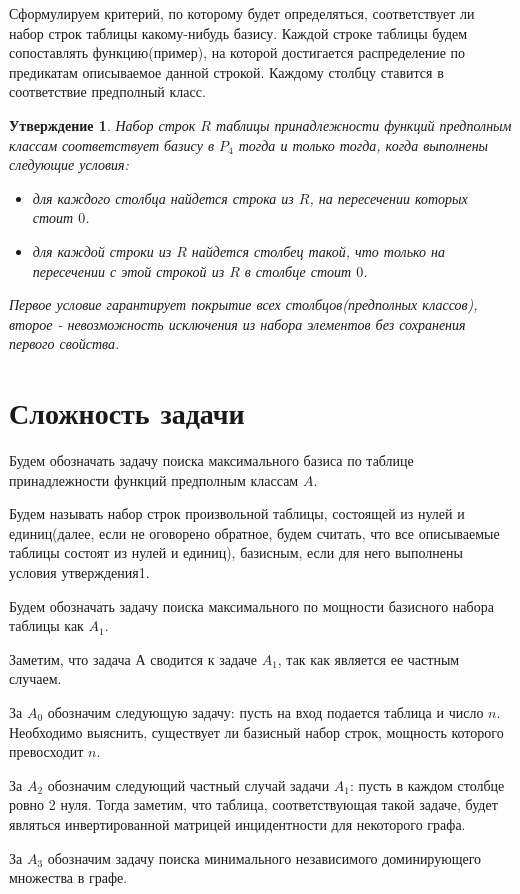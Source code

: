 \documentclass[a4paper,14pt]{extreport}
\newtheorem{utv}{Утверждение}
\begin{document}
Сформулируем критерий, по которому будет определяться, соответствует ли набор строк таблицы какому-нибудь базису.
Каждой строке таблицы будем сопоставлять функцию(пример), на которой достигается распределение по предикатам описываемое данной строкой. Каждому столбцу ставится в соответствие предполный класс.  
\begin{utv}
Набор строк $R$ таблицы принадлежности функций предполным классам соответствует базису в $P_4$ тогда и только тогда, когда выполнены следующие условия:
\begin{itemize}
\item для каждого столбца найдется строка из $R$, на пересечении которых стоит $0$.    
\item для каждой строки из $R$ найдется столбец такой, что только на пересечении с этой строкой из $R$ в столбце стоит $0$.   
\end{itemize}
Первое условие гарантирует покрытие всех столбцов(предполных классов), второе - невозможность исключения из набора элементов без сохранения первого свойства. 
\end{utv}

\section{Сложность задачи}
Будем обозначать задачу поиска максимального базиса по таблице принадлежности функций предполным классам $A$.

Будем называть набор строк произвольной таблицы, состоящей из нулей и единиц(далее, если не оговорено обратное, будем считать, что все описываемые таблицы состоят из нулей и единиц), базисным, если для него выполнены условия утверждения1.

Будем обозначать задачу поиска максимального по мощности базисного набора таблицы как $A_1$.

Заметим, что задача А сводится к задаче $A_1$, так как является ее частным случаем.

За $A_0$ обозначим следующую задачу: пусть на вход подается таблица и число $n$. Необходимо выяснить, существует ли базисный набор строк, мощность которого превосходит $n$.

За $A_2$ обозначим следующий частный случай задачи $A_1$: пусть в каждом столбце ровно 2 нуля. Тогда заметим, что таблица, соответствующая такой задаче, будет являться инвертированной матрицей инцидентности для некоторого графа.

За $A_3$ обозначим задачу поиска минимального независимого доминирующего множества в графе.
\end{document}
